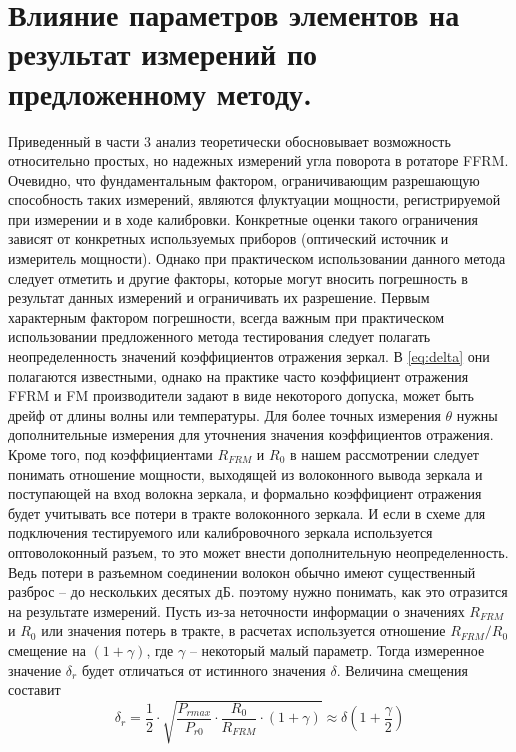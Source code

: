 \documentclass{article}
\begin{document}
\section{Влияние параметров элементов на результат измерений по предложенному методу.}
Приведенный в части 3 анализ теоретически обосновывает возможность относительно простых, но надежных измерений угла поворота в ротаторе FFRM.
Очевидно, что фундаментальным фактором, ограничивающим разрешающую способность таких измерений, являются флуктуации мощности, регистрируемой при измерении и в ходе калибровки.
Конкретные оценки такого ограничения зависят от конкретных используемых приборов (оптический источник и измеритель мощности).
Однако при практическом использовании данного метода следует отметить и другие факторы, которые могут вносить погрешность в результат данных измерений и ограничивать их разрешение.   
Первым характерным фактором погрешности, всегда важным при практическом использовании предложенного метода тестирования следует полагать неопределенность значений коэффициентов отражения зеркал.
В \ref{eq:delta} они полагаются известными, однако на практике часто коэффициент отражения FFRM и FM производители задают в виде некоторого допуска, может быть дрейф от длины волны или температуры.
Для более точных измерения $\theta$ нужны дополнительные измерения для уточнения значения коэффициентов отражения.
Кроме того, под коэффициентами $R_{FRM}$ и $R_0$ в нашем рассмотрении следует понимать отношение мощности, выходящей из волоконного вывода зеркала и поступающей на вход волокна зеркала, и формально коэффициент отражения будет учитывать все потери в тракте волоконного зеркала. И если в схеме для подключения тестируемого или калибровочного зеркала используется оптоволоконный разъем, то это может внести дополнительную неопределенность. Ведь потери в разъемном соединении волокон обычно имеют существенный разброс – до нескольких десятых дБ. поэтому нужно понимать, как это отразится на результате измерений. Пусть из-за неточности информации о значениях $R_{FRM}$ и $R_0$ или значения потерь в тракте, в расчетах используется отношение $R_{FRM}/R_0$ смещение на $(1+\gamma)$, где $\gamma$ – некоторый малый параметр. Тогда измеренное значение $\delta_r$ будет отличаться от истинного значения $\delta$. Величина смещения составит    
\begin{equation}
    \label{eq:delta_r}
    \delta_r=\frac{1}{2}\cdot\sqrt{\frac{P_{rmax}}{P_{r0}}\cdot\frac{R_0}{R_{FRM}}\cdot(1+\gamma)}\approx\delta\left( 1+\frac{\gamma}{2} \right)
\end{equation}
\end{document}
